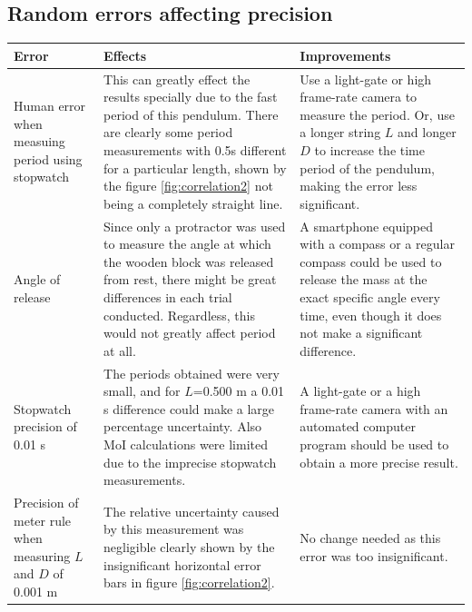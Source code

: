 \documentclass[a4paper,12pt]{article}
\theoremstyle{definition}
\begin{document}
\subsection{Random errors affecting precision}
\begin{table}[!h]
\begin{tabular}{|p{3cm}|p{6cm}|p{5cm}|}
\hline
\textbf{Error}             & \textbf{Effects}                                                                                                          & \textbf{Improvements} \\ \hline
              Human error when measuing period using stopwatch          &        This can greatly effect the results specially due to the fast period of this pendulum. There are clearly some period measurements with 0.5s different for a particular length, shown by the figure \ref{fig:correlation2} not being a completely straight line.         &   Use a light-gate or high frame-rate camera to measure the period. Or, use a longer string $L$ and longer $D$ to increase the time period of the pendulum, making the error less significant.   \\ \hline
     Angle of release          & Since only a protractor was used to measure the angle at which the wooden block was released from rest, there might be great differences in each trial conducted. Regardless, this would not greatly affect period at all.&   A smartphone equipped with a compass or a regular compass could be used to release the mass at the exact specific angle every time, even though it does not make a significant difference.        \\ \hline
           Stopwatch precision   of 0.01 s           &      The periods obtained were very small, and for $L$=0.500 m a 0.01 s difference could make a large percentage uncertainty. Also MoI calculations were limited due to the imprecise stopwatch measurements.                                                                                           &     A light-gate or  a high frame-rate camera with an automated computer program should be used to obtain a more precise result.       \\ \hline
   Precision of meter rule when measuring $L$ and $D$ of 0.001 m &  The relative uncertainty caused by this measurement was negligible clearly shown by the insignificant horizontal error bars in figure \ref{fig:correlation2}.                                                                                                                      &  No change needed as this error was too insignificant. \\ \hline
\end{tabular}
\end{table}
\end{document}
